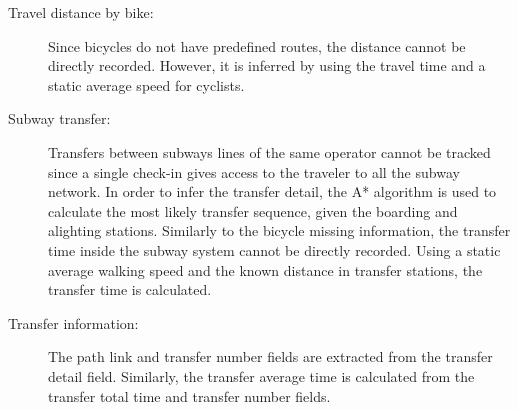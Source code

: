 \documentclass{article}
\begin{document}
\begin{description}%
\item[Travel distance by bike:] Since bicycles do not have predefined routes, the distance cannot be directly recorded. However, it is inferred by using the travel time and a static average speed for cyclists. 

\item[Subway transfer:] Transfers between subways lines of the same operator cannot be tracked since a single check-in gives access to the traveler to all the subway network. In order to infer the transfer detail, the A* algorithm is used to calculate the most likely transfer sequence, given the boarding and alighting stations. 
Similarly to the bicycle missing information, the transfer time inside the subway system cannot be directly recorded. Using a static average walking speed and the known distance in transfer stations, the transfer time is calculated. 

\item[Transfer information:] The path link and transfer number fields are extracted from the transfer detail field. Similarly, the transfer average time is calculated from the transfer total time and transfer number fields. 
\end{description}
\end{document}
